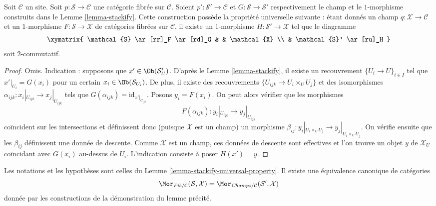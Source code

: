 \begin{lemma}
\label{lemma-stackify-universal-property}
Soit $\mathcal{C}$ un site.
Soit $p : \mathcal{S} \to \mathcal{C}$ une catégorie fibrée sur $\mathcal{C}$.
Soient $p' : \mathcal{S}' \to \mathcal{C}$ et $G : \mathcal{S} \to \mathcal{S}'$
respectivement le champ et le $1$-morphisme construits dans le Lemme \ref{lemma-stackify}.
Cette construction possède la propriété universelle suivante : étant donnés un champ
$q : \mathcal{X} \to \mathcal{C}$ et un $1$-morphisme
$F : \mathcal{S} \to \mathcal{X}$ de catégories fibrées sur $\mathcal{C}$,
il existe un $1$-morphisme $H : \mathcal{S}' \to \mathcal{X}$
tel que le diagramme
$$
\xymatrix{
\mathcal{S} \ar[rr]_F \ar[rd]_G & & \mathcal{X} \\
& \mathcal{S}' \ar[ru]_H
}
$$
soit $2$-commutatif.
\end{lemma}

\begin{proof}
Omis. Indication : supposons que $x' \in \Ob(\mathcal{S}'_U)$.
D'après le Lemme \ref{lemma-stackify},
il existe un recouvrement $\{U_i \to U\}_{i \in I}$
tel que $x'|_{U_i} = G(x_i)$ pour un certain $x_i \in \Ob(\mathcal{S}_{U_i})$.
De plus, il existe des recouvrements $\{U_{ijk} \to U_i \times_U U_j\}$
et des isomorphismes $\alpha_{ijk} : x_i|_{U_{ijk}} \to x_j|_{U_{ijk}}$
tels que $G(\alpha_{ijk}) = \text{id}_{x'|_{U_{ijk}}}$. Posons $y_i = F(x_i)$.
On peut alors vérifier que les morphismes
$$
F(\alpha_{ijk}) : y_i|_{U_{ijk}} \to y_j|_{U_{ijk}}
$$
coïncident sur les intersections et définissent donc (puisque $\mathcal{X}$ est un champ)
un morphisme $\beta_{ij} : y_i|_{U_i \times_U U_j} \to y_j|_{U_i \times_U U_j}$.
On vérifie ensuite que les $\beta_{ij}$ définissent une donnée de descente. Comme
$\mathcal{X}$ est un champ, ces données de descente sont effectives et l'on trouve
un objet $y$ de $\mathcal{X}_U$ coïncidant avec $G(x_i)$ au-dessus de $U_i$.
L'indication consiste à poser $H(x') = y$.
\end{proof}

\begin{lemma}
\label{lemma-stackify-universal-property-more}
Les notations et les hypothèses sont celles du
Lemme \ref{lemma-stackify-universal-property}.
Il existe une équivalence canonique de catégories
$$
\Mor_{\textit{Fib}/\mathcal{C}}(\mathcal{S}, \mathcal{X})
=
\Mor_{\textit{Champs}/\mathcal{C}}(\mathcal{S}', \mathcal{X})
$$
donnée par les constructions de la démonstration du lemme précité.
\end{lemma}

